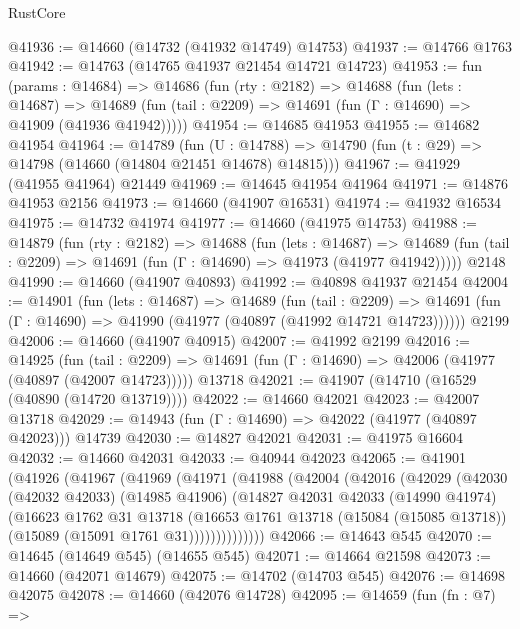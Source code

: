 \begin{lexlean}{RustCore}
\begin{coremodule}
@41936 := @14660 (@14732 (@41932 @14749) @14753)
@41937 := @14766 @1763
@41942 := @14763 (@14765 @41937 @21454 @14721 @14723)
@41953 := fun (params : @14684) =>
  @14686
    (fun (rty : @2182) =>
    @14688
      (fun (lets : @14687) =>
      @14689 (fun (tail : @2209) => @14691 (fun (Γ : @14690) => @41909 (@41936 @41942)))))
@41954 := @14685 @41953
@41955 := @14682 @41954
@41964 := @14789
    (fun (U : @14788) => @14790 (fun (t : @29) => @14798 (@14660 (@14804 @21451 @14678) @14815)))
@41967 := @41929 (@41955 @41964) @21449
@41969 := @14645 @41954 @41964
@41971 := @14876 @41953 @2156
@41973 := @14660 (@41907 @16531)
@41974 := @41932 @16534
@41975 := @14732 @41974
@41977 := @14660 (@41975 @14753)
@41988 := @14879
    (fun (rty : @2182) =>
    @14688
      (fun (lets : @14687) =>
      @14689 (fun (tail : @2209) => @14691 (fun (Γ : @14690) => @41973 (@41977 @41942)))))
    @2148
@41990 := @14660 (@41907 @40893)
@41992 := @40898 @41937 @21454
@42004 := @14901
    (fun (lets : @14687) =>
    @14689
      (fun (tail : @2209) =>
      @14691 (fun (Γ : @14690) => @41990 (@41977 (@40897 (@41992 @14721 @14723))))))
    @2199
@42006 := @14660 (@41907 @40915)
@42007 := @41992 @2199
@42016 := @14925
    (fun (tail : @2209) => @14691 (fun (Γ : @14690) => @42006 (@41977 (@40897 (@42007 @14723)))))
    @13718
@42021 := @41907 (@14710 (@16529 (@40890 (@14720 @13719))))
@42022 := @14660 @42021
@42023 := @42007 @13718
@42029 := @14943 (fun (Γ : @14690) => @42022 (@41977 (@40897 @42023))) @14739
@42030 := @14827 @42021
@42031 := @41975 @16604
@42032 := @14660 @42031
@42033 := @40944 @42023
@42065 := @41901
    (@41926
      (@41967
        (@41969
          (@41971
            (@41988
              (@42004
                (@42016
                  (@42029
                    (@42030
                      (@42032 @42033)
                      (@14985 @41906)
                      (@14827
                        @42031
                        @42033
                        (@14990 @41974)
                        (@16623
                          @1762
                          @31
                          @13718
                          (@16653
                            @1761
                            @13718
                            (@15084 (@15085 @13718))
                            (@15089 (@15091 @1761 @31))))))))))))))
@42066 := @14643 @545
@42070 := @14645 (@14649 @545) (@14655 @545)
@42071 := @14664 @21598
@42073 := @14660 (@42071 @14679)
@42075 := @14702 (@14703 @545)
@42076 := @14698 @42075
@42078 := @14660 (@42076 @14728)
@42095 := @14659
    (fun (fn : @7) =>

\end{coremodule}
\end{lexlean}
